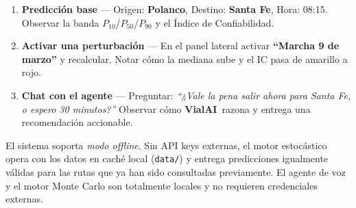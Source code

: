 \documentclass[11pt,a4paper]{article}
\newcommand{\VialAI}{\textbf{\textcolor{vialTeal}{Vial}\textcolor{vialAmber}{AI}}}
\begin{document}
\begin{enumerate}
\item \textbf{Predicción base} --- Origen: \textbf{Polanco},
Destino: \textbf{Santa Fe}, Hora: 08:15. Observar la banda
$P_{10}$/$P_{50}$/$P_{90}$ y el Índice de Confiabilidad.

\item \textbf{Activar una perturbación} --- En el panel lateral
activar \textbf{``Marcha 9 de marzo''} y recalcular. Notar cómo la
mediana sube y el IC pasa de amarillo a rojo.

\item \textbf{Chat con el agente} --- Preguntar: \textit{``¿Vale la
pena salir ahora para Santa Fe, o espero 30 minutos?''} Observar cómo
\VialAI\ razona y entrega una recomendación accionable.
\end{enumerate}

\begin{tipbox}
El sistema soporta \emph{modo offline}. Sin API keys externas,
el motor estocástico opera con los datos en caché local
(\texttt{data/}) y entrega predicciones igualmente válidas
para las rutas que ya han sido consultadas previamente.
El agente de voz y el motor Monte Carlo son totalmente locales
y no requieren credenciales externas.
\end{tipbox}
\end{document}
